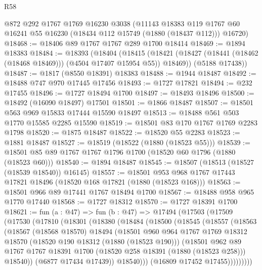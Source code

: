 \begin{lexlean}{R58}
\begin{coremodule}
    @872
    @292
    @1767
    @1769
    @16230
    @3038
    (@11143
      @18383
      @119
      @1767
      @60
      @16241
      @55
      @16230
      (@18434 @112 @15749 (@1880 (@18437 @112)))
      @16720)
@18468 := @18406 @89 @1767 @1767 @289 @1700 @18414
@18469 := @1894 @18383
@18484 := @18393
    (@18404
      (@18415 (@18421 (@18427 (@18441 (@18462 (@18468 @18469))) (@4504 @17407 @15954 @55)) @18469))
      (@5188 @17438))
@18487 := @1817 (@8550 @18391) @18383
@18488 := @1944 @18487
@18492 := @18488 @747 @970 @17445 @17456
@18493 := @1727 @17821
@18494 := @232 @17455
@18496 := @1727 @18494 @1700
@18497 := @18493 @18496
@18500 := @18492 (@16090 @18497) @17501
@18501 := @1866 @18487
@18507 := @18501 @563 @969 @15833 @17444 @15590 @18497
@18513 := @18488 @561 @503 @1770 @15585 @2285 @15590
@18519 := @18501 @83 @170 @1767 @1769 @2283 @1798
@18520 := @1875 @18487
@18522 := @18520 @55 @2283
@18523 := @1881 @18487
@18527 := @18519 (@18522 (@1880 (@18523 @55)))
@18539 := @18501 @85 @89 @1767 @1767 @1796 @1700 (@18520 @60 @1796 (@1880 (@18523 @60)))
@18540 := @1894 @18487
@18545 := @18507 (@18513 (@18527 (@18539 @18540)) @16145)
@18557 := @18501 @953 @968 @1767 @17443 @17821 @18496 (@18520 @168 @17821 (@1880 (@18523 @168)))
@18563 := @18501 @966 @89 @17441 @1767 @18494 @1700
@18567 := @18488 @958 @965 @1770 @17440
@18568 := @1727 @18312
@18570 := @1727 @18391 @1700
@18621 := fun (a : @47) =>
  fun (b : @47) =>
  @17494
    (@17503
      (@17509
        (@17530
          (@17810
            (@18301
              (@18380
                (@18484
                  (@18500
                    (@18545
                      (@18557
                        (@18563
                          (@18567
                            (@18568 @18570)
                            @18494
                            (@18501
                              @960
                              @964
                              @1767
                              @1769
                              @18312
                              @18570
                              (@18520 @190 @18312 (@1880 (@18523 @190)))
                              (@18501
                                @962
                                @89
                                @1767
                                @1767
                                @18391
                                @1700
                                (@18520 @258 @18391 (@1880 (@18523 @258)))
                                @18540))
                            (@6877 @17434 @17439))
                          @18540)))
                    (@16809 @17452 @17455)))))))))

\end{coremodule}
\end{lexlean}
